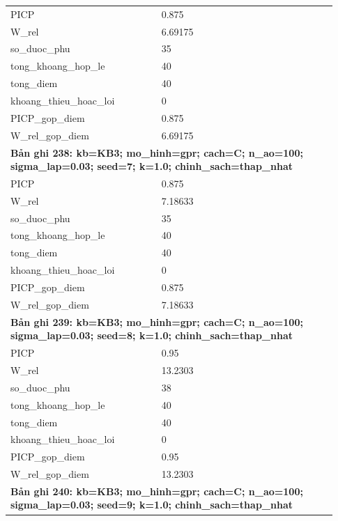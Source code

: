 \begin{longtable}{p{0.43\linewidth}p{0.50\linewidth}}
PICP & 0.875 \\
W\_\allowbreak rel & 6.69175 \\
so\_\allowbreak duoc\_\allowbreak phu & 35 \\
tong\_\allowbreak khoang\_\allowbreak hop\_\allowbreak le & 40 \\
tong\_\allowbreak diem & 40 \\
khoang\_\allowbreak thieu\_\allowbreak hoac\_\allowbreak loi & 0 \\
PICP\_\allowbreak gop\_\allowbreak diem & 0.875 \\
W\_\allowbreak rel\_\allowbreak gop\_\allowbreak diem & 6.69175 \\
\midrule
\multicolumn{2}{p{0.95\linewidth}}{\textbf{Bản ghi 238: kb=KB3; mo\_hinh=gpr; cach=C; n\_ao=100; sigma\_lap=0.03; seed=7; k=1.0; chinh\_sach=thap\_nhat}} \\
PICP & 0.875 \\
W\_\allowbreak rel & 7.18633 \\
so\_\allowbreak duoc\_\allowbreak phu & 35 \\
tong\_\allowbreak khoang\_\allowbreak hop\_\allowbreak le & 40 \\
tong\_\allowbreak diem & 40 \\
khoang\_\allowbreak thieu\_\allowbreak hoac\_\allowbreak loi & 0 \\
PICP\_\allowbreak gop\_\allowbreak diem & 0.875 \\
W\_\allowbreak rel\_\allowbreak gop\_\allowbreak diem & 7.18633 \\
\midrule
\multicolumn{2}{p{0.95\linewidth}}{\textbf{Bản ghi 239: kb=KB3; mo\_hinh=gpr; cach=C; n\_ao=100; sigma\_lap=0.03; seed=8; k=1.0; chinh\_sach=thap\_nhat}} \\
PICP & 0.95 \\
W\_\allowbreak rel & 13.2303 \\
so\_\allowbreak duoc\_\allowbreak phu & 38 \\
tong\_\allowbreak khoang\_\allowbreak hop\_\allowbreak le & 40 \\
tong\_\allowbreak diem & 40 \\
khoang\_\allowbreak thieu\_\allowbreak hoac\_\allowbreak loi & 0 \\
PICP\_\allowbreak gop\_\allowbreak diem & 0.95 \\
W\_\allowbreak rel\_\allowbreak gop\_\allowbreak diem & 13.2303 \\
\midrule
\multicolumn{2}{p{0.95\linewidth}}{\textbf{Bản ghi 240: kb=KB3; mo\_hinh=gpr; cach=C; n\_ao=100; sigma\_lap=0.03; seed=9; k=1.0; chinh\_sach=thap\_nhat}} \\

\end{longtable}
